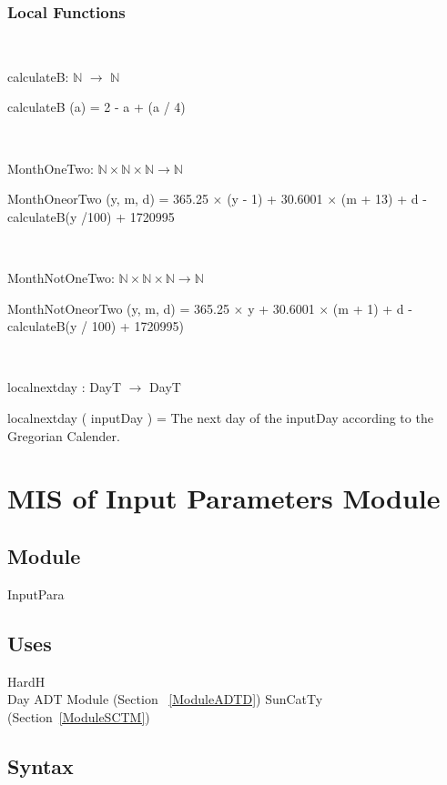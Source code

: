 \documentclass[12pt, titlepage]{article}
\begin{document}
\subsubsection{Local Functions}

~\newline

calculateB: $\mathbb{N}$ $\rightarrow $ $\mathbb{N}$

calculateB (a) = 2 - a + (a / 4)

~\newline

MonthOneTwo: $\mathbb{N} \times \mathbb{N} \times \mathbb{N} \rightarrow \mathbb{N}$

MonthOneorTwo (y, m, d) = 365.25 $\times$ (y - 1) + 30.6001 $\times$ (m + 13) + d - calculateB(y /100) +  1720995

~\newline

MonthNotOneTwo: $\mathbb{N} \times \mathbb{N} \times \mathbb{N} \rightarrow \mathbb{N}$

MonthNotOneorTwo (y, m, d) = 365.25 $\times$ y + 30.6001 $\times$ (m + 1) + d - calculateB(y / 100) +  1720995)

~\newline

localnextday : DayT $\rightarrow$ DayT

localnextday ( inputDay ) = The next day of the  inputDay according to the Gregorian Calender.

\newpage


\section{MIS of Input Parameters Module} \label{ModuleIP} 

\subsection{Module}
InputPara

\subsection{Uses}
HardH\\
Day ADT Module (Section ~\ref{ModuleADTD})
SunCatTy (Section~\ref{ModuleSCTM}) \\
\subsection{Syntax}
\end{document}
